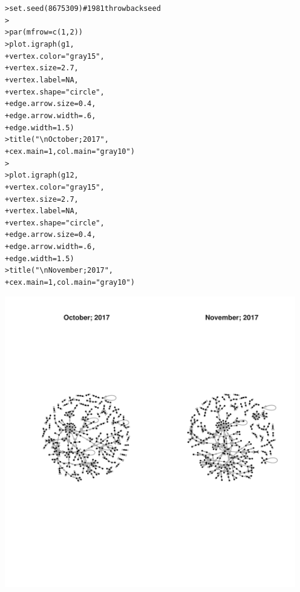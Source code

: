 \documentclass[12pt]{article}\usepackage[]{graphicx}\usepackage[]{color}
\makeatletter
\newcommand{\hlnum}[1]{\textcolor[rgb]{0.82,0.78,0.62}{#1}}%
\newcommand{\hlstr}[1]{\textcolor[rgb]{0.82,0.78,0.62}{#1}}%
\newcommand{\hlcom}[1]{\textcolor[rgb]{0.404,0.408,0.42}{#1}}%
\newcommand{\hlstd}[1]{\textcolor[rgb]{0.882,0.878,0.898}{#1}}%
\newcommand{\hlkwc}[1]{\textcolor[rgb]{0.812,0.522,0.388}{#1}}%
\newcommand{\hlkwd}[1]{\textcolor[rgb]{0.733,0.388,0.812}{#1}}%
\newenvironment{kframe}{%
 \def\at@end@of@kframe{}%
 \ifinner\ifhmode%
  \def\at@end@of@kframe{\end{minipage}}%
  \begin{minipage}{\columnwidth}%
 \fi\fi%
 \def\FrameCommand##1{\hskip\@totalleftmargin \hskip-\fboxsep
 \colorbox{shadecolor}{##1}\hskip-\fboxsep
     \hskip-\linewidth \hskip-\@totalleftmargin \hskip\columnwidth}%
 \MakeFramed {\advance\hsize-\width
   \@totalleftmargin\z@ \linewidth\hsize
   \@setminipage}}%
 {\par\unskip\endMakeFramed%
 \at@end@of@kframe}
\newenvironment{knitrout}{}{} %
\makeatother
\begin{document}
\begin{flushleft}
\begin{center}
\begin{knitrout}
\color{fgcolor}\begin{kframe}
\begin{alltt}
\hlstd{> }\hlkwd{set.seed}\hlstd{(}\hlnum{8675309}\hlstd{)}  \hlcom{# 1981 throwback seed}
\hlstd{> }
\hlstd{> }\hlkwd{par}\hlstd{(}\hlkwc{mfrow}\hlstd{=}\hlkwd{c}\hlstd{(}\hlnum{1}\hlstd{,}\hlnum{2}\hlstd{))}
\hlstd{> }\hlkwd{plot.igraph}\hlstd{(g1,}
\hlstd{+ }            \hlkwc{vertex.color}\hlstd{=}\hlstr{"gray15"}\hlstd{,}
\hlstd{+ }            \hlkwc{vertex.size}\hlstd{=}\hlnum{2.7}\hlstd{,}
\hlstd{+ }            \hlkwc{vertex.label}\hlstd{=}\hlnum{NA}\hlstd{,}
\hlstd{+ }            \hlkwc{vertex.shape}\hlstd{=}\hlstr{"circle"}\hlstd{,}
\hlstd{+ }            \hlkwc{edge.arrow.size}\hlstd{=}\hlnum{0.4}\hlstd{,}
\hlstd{+ }            \hlkwc{edge.arrow.width}\hlstd{=}\hlnum{.6}\hlstd{,}
\hlstd{+ }            \hlkwc{edge.width}\hlstd{=}\hlnum{1.5}\hlstd{)}
\hlstd{> }\hlkwd{title}\hlstd{(}\hlstr{"\textbackslash{}n October; 2017"}\hlstd{,}
\hlstd{+ }      \hlkwc{cex.main}\hlstd{=}\hlnum{1}\hlstd{,} \hlkwc{col.main}\hlstd{=}\hlstr{"gray10"}\hlstd{)}
\hlstd{> }
\hlstd{> }\hlkwd{plot.igraph}\hlstd{(g12,}
\hlstd{+ }            \hlkwc{vertex.color}\hlstd{=}\hlstr{"gray15"}\hlstd{,}
\hlstd{+ }            \hlkwc{vertex.size}\hlstd{=}\hlnum{2.7}\hlstd{,}
\hlstd{+ }            \hlkwc{vertex.label}\hlstd{=}\hlnum{NA}\hlstd{,}
\hlstd{+ }            \hlkwc{vertex.shape}\hlstd{=}\hlstr{"circle"}\hlstd{,}
\hlstd{+ }            \hlkwc{edge.arrow.size}\hlstd{=}\hlnum{0.4}\hlstd{,}
\hlstd{+ }            \hlkwc{edge.arrow.width}\hlstd{=}\hlnum{.6}\hlstd{,}
\hlstd{+ }            \hlkwc{edge.width}\hlstd{=}\hlnum{1.5}\hlstd{)}
\hlstd{> }\hlkwd{title}\hlstd{(}\hlstr{"\textbackslash{}n November; 2017"}\hlstd{,}
\hlstd{+ }      \hlkwc{cex.main}\hlstd{=}\hlnum{1}\hlstd{,} \hlkwc{col.main}\hlstd{=}\hlstr{"gray10"}\hlstd{)}
\end{alltt}
\end{kframe}
\includegraphics[width=5in]{figure/plot1-1} 

\end{knitrout}
\end{center}
\end{flushleft}
\end{document}
